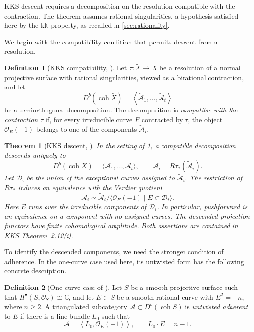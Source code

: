\documentclass[11pt]{article}
\theoremstyle{plain}
\newtheorem{theorem}{Theorem}[section]
\theoremstyle{definition}
\newtheorem{definition}[definition]{Definition}
\theoremstyle{remark}
\newcommand{\C}{\mathbb C}
\newcommand{\Db}{D^b}
\newcommand{\coh}{\operatorname{coh}}
\newcommand{\OO}{\mathcal O}
\begin{document}
KKS descent requires
a decomposition on the resolution compatible with the contraction.
The theorem assumes rational singularities, a hypothesis satisfied here
by the klt property, as recalled in \cref{sec:rationality}.

We begin with the compatibility condition that permits descent from a
resolution.

\begin{definition}[{KKS compatibility, \cite[Definition~2.7]{KKS2020}}]\label{def:kks-compatibility}
Let \(\tau:\widetilde X\to X\) be a resolution of a normal projective surface
with rational singularities,
viewed as a birational contraction, and let
\[
\Db(\coh\widetilde X)
=
\left\langle
\widetilde{\mathcal A}_1,\dots,\widetilde{\mathcal A}_t
\right\rangle
\]
be a semiorthogonal decomposition. The decomposition is \emph{compatible
with the contraction \(\tau\)} if, for every irreducible curve \(E\)
contracted by \(\tau\), the object \(\OO_E(-1)\) belongs to one of the
components \(\widetilde{\mathcal A}_i\).
\end{definition}

\begin{theorem}[{KKS descent, \cite[Theorem~2.12(i)]{KKS2020}}]
\label{thm:kks-descent}
In the setting of \cref{def:kks-compatibility}, a compatible decomposition
descends uniquely to
\[
\Db(\coh X)=\langle\mathcal A_1,\ldots,\mathcal A_t\rangle,
\qquad
\mathcal A_i=R\tau_*(\widetilde{\mathcal A}_i).
\]
Let \(\mathcal D_i\) be the union of the exceptional curves assigned to
\(\widetilde{\mathcal A}_i\). The restriction of \(R\tau_*\) induces
an equivalence with the Verdier quotient
\[
\mathcal A_i\simeq
\widetilde{\mathcal A}_i/
\langle\OO_E(-1)\mid E\subset\mathcal D_i\rangle.
\]
Here \(E\) runs over the irreducible components of \(\mathcal D_i\).
In particular, pushforward is an equivalence on a component with no assigned curves.
The descended projection functors have finite cohomological amplitude.
Both assertions are contained in KKS Theorem~2.12(i).
\end{theorem}

To identify the descended components, we need the stronger condition of
adherence. In the one-curve case used here, its untwisted form has the
following concrete description.

\begin{definition}[{One-curve case of \cite[Definition~3.6]{KKS2020}}]
Let \(S\) be a smooth projective surface such
that \(H^\bullet(S,\OO_S)\cong\C\), and let \(E\subset S\) be a smooth
rational curve with \(E^2=-n\), where \(n\geq2\). A triangulated subcategory
\(\mathcal A\subset\Db(\coh S)\) is \emph{untwisted adherent} to \(E\) if
there is a line bundle \(L_0\) such that
\[
\mathcal A
=
\left\langle
L_0,\OO_E(-1)
\right\rangle,
\qquad
L_0\cdot E=n-1.
\]
\end{definition}
\end{document}
